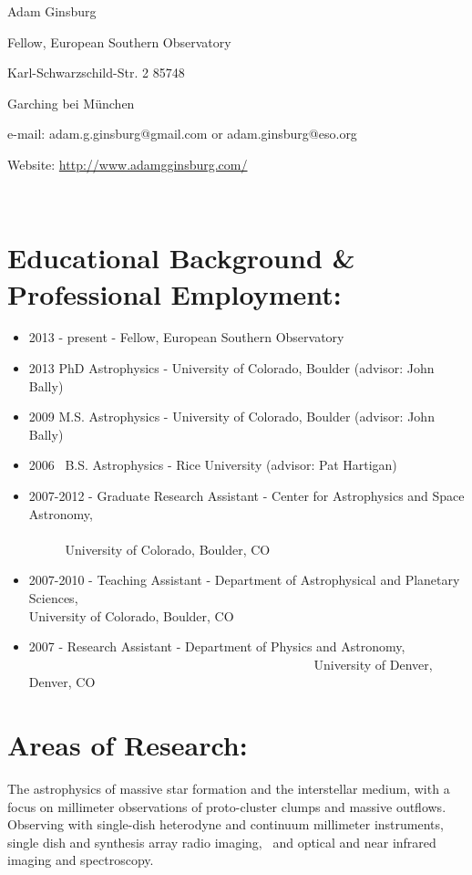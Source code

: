 \documentclass{article}
\begin{document}
\begin{centering}
\par Adam Ginsburg 
\par Fellow, European Southern Observatory
\par Karl-Schwarzschild-Str. 2 85748
\par Garching bei München
\par e-mail: adam.g.ginsburg@gmail.com or adam.ginsburg@eso.org
\par \hspace{20mm} Website: \url{http://www.adamgginsburg.com/}
\end{centering}
  
\section*{Educational Background \& Professional Employment: }
\begin{itemize}
    \item 2013 - present - Fellow, European Southern Observatory
    \item 2013 PhD Astrophysics - University of Colorado, Boulder (advisor: John Bally)
    \item 2009 M.S. Astrophysics - University of Colorado, Boulder (advisor: John Bally)
    \item 2006  B.S. Astrophysics - Rice University (advisor: Pat Hartigan)
    \item 2007-2012 - Graduate Research Assistant - Center for Astrophysics and Space Astronomy, 
                                                                          University of Colorado, Boulder, CO 
    \item 2007-2010    - Teaching Assistant - Department of Astrophysical and Planetary Sciences, 
                                                              University of Colorado, Boulder, CO 
    \item 2007 - Research Assistant - Department of Physics and Astronomy, 
                                                 University of Denver, Denver, CO 
\end{itemize}

\section*{Areas of Research: }
The astrophysics of massive star formation and the interstellar medium, with a
focus on millimeter observations of proto-cluster clumps and massive outflows. 
Observing with single-dish heterodyne and continuum millimeter instruments,
single dish and synthesis array radio imaging,  and optical and near infrared
imaging and spectroscopy.  
\end{document}
